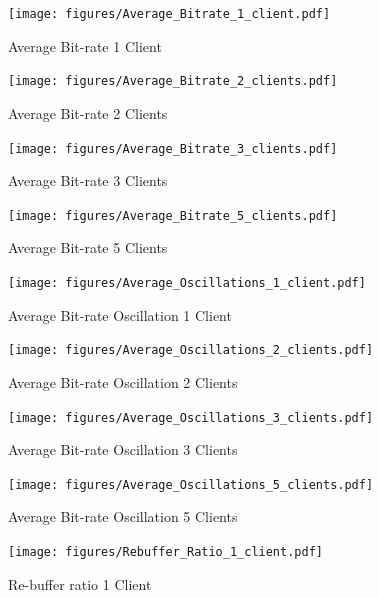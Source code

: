 \documentclass[10pt,sigconf]{acmart}
\begin{document}


\begin{figure}
  \centering
  \texttt{[image: figures/Average\_Bitrate\_1\_client.pdf]}
  \caption{Average Bit-rate 1 Client}
  \label{fig:avg-bitrate-clients-1}
\end{figure}


\begin{figure}
  \centering
  \texttt{[image: figures/Average\_Bitrate\_2\_clients.pdf]}
  \caption{Average Bit-rate 2 Clients}
  \label{fig:avg-bitrate-clients-2}
\end{figure}

\begin{figure}
  \centering
  \texttt{[image: figures/Average\_Bitrate\_3\_clients.pdf]}
  \caption{Average Bit-rate 3 Clients}
  \label{fig:avg-bitrate-clients-3}
\end{figure}

\begin{figure}
  \centering
  \texttt{[image: figures/Average\_Bitrate\_5\_clients.pdf]}
  \caption{Average Bit-rate 5 Clients}
  \label{fig:avg-bitrate-clients-5}
\end{figure}

\begin{figure}
  \centering
  \texttt{[image: figures/Average\_Oscillations\_1\_client.pdf]}
  \caption{Average Bit-rate Oscillation 1 Client}
  \label{fig:avg-oscillation-clients-1}
\end{figure}

\begin{figure}
  \centering
  \texttt{[image: figures/Average\_Oscillations\_2\_clients.pdf]}
  \caption{Average Bit-rate Oscillation 2 Clients}
  \label{fig:avg-oscillation-clients-2}
\end{figure}

\begin{figure}
  \centering
  \texttt{[image: figures/Average\_Oscillations\_3\_clients.pdf]}
  \caption{Average Bit-rate Oscillation 3 Clients}
  \label{fig:avg-oscillation-clients-3}
\end{figure}

\begin{figure}
  \centering
  \texttt{[image: figures/Average\_Oscillations\_5\_clients.pdf]}
  \caption{Average Bit-rate Oscillation 5 Clients}
  \label{fig:avg-oscillation-clients-5}
\end{figure}

\begin{figure}
  \centering
  \texttt{[image: figures/Rebuffer\_Ratio\_1\_client.pdf]}
  \caption{Re-buffer ratio 1 Client}
  \label{fig:rebuffer-ratio-clients-1}
\end{figure}
\end{document}

